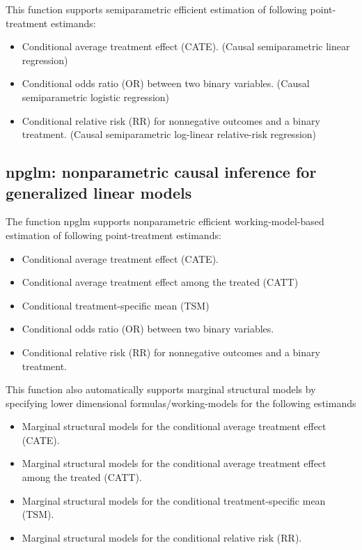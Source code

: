 \documentclass{article}
\begin{document}
This function supports semiparametric efficient estimation of following point-treatment estimands:

\begin{itemize}
\item Conditional average treatment effect (CATE). (Causal semiparametric linear regression)
\item Conditional odds ratio (OR) between two binary variables. (Causal semiparametric logistic regression)
\item Conditional relative risk (RR) for nonnegative outcomes and a binary treatment. (Causal semiparametric log-linear relative-risk regression)

\end{itemize}



\subsection{npglm: nonparametric causal inference for generalized linear models}

The function npglm supports nonparametric efficient working-model-based estimation of following point-treatment estimands:

\begin{itemize}
\item Conditional average treatment effect (CATE).
\item Conditional average treatment effect among the treated (CATT)
\item Conditional treatment-specific mean (TSM)
\item Conditional odds ratio (OR) between two binary variables. 
\item Conditional relative risk (RR) for nonnegative outcomes and a binary treatment.  
\end{itemize}

This function also automatically supports marginal structural models by specifying lower dimensional formulas/working-models for the following estimands
\begin{itemize}
\item Marginal structural models for the conditional average treatment effect (CATE).
\item Marginal structural models for the conditional average treatment effect among the treated (CATT).
\item Marginal structural models for the conditional treatment-specific mean (TSM).
\item Marginal structural models for the conditional relative risk (RR). 
\end{itemize}
\end{document}
